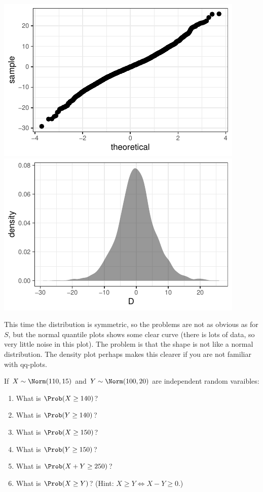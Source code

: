 \documentclass[twoside]{book}\usepackage[]{graphicx}\usepackage[]{xcolor}
\makeatletter
\def\maxwidth{ %
  \ifdim\Gin@nat@width>\linewidth
    \linewidth
  \else
    \Gin@nat@width
  \fi
}
\newenvironment{knitrout}{}{} %
\makeatother
\begin{document}
\begin{solution}
\begin{knitrout}
{\centering \includegraphics[width=\maxwidth]{figures/fig-unnamed-chunk-147-1} 
\includegraphics[width=\maxwidth]{figures/fig-unnamed-chunk-147-2} 

}



\end{knitrout}

This time the distribution is symmetric, so the problems are not as obvious as for $S$, but the 
normal quantile plots shows some clear curve (there is lots of data, so very little noise in
this plot).  The problem is that the shape is not like a normal distribution.  
The density plot perhaps makes this clearer if you are not familiar with qq-plots.
\end{solution}

\begin{problem}
	If $X \sim \Norm(110, 15)$ and $Y \sim \Norm(100, 20)$ are independent
	random varaibles:
	
	\begin{enumerate}
		\item
			What is $\Prob(X \ge 140)$?
		\item
			What is $\Prob(Y \ge 140)$?
		\item
			What is $\Prob(X \ge 150)$?
		\item
			What is $\Prob(Y \ge 150)$?
		\item
			What is $\Prob(X + Y \ge 250)$?
		\item
			What is $\Prob(X \ge Y)$? (Hint: $X \ge Y \Leftrightarrow X - Y \ge 0$.)
	\end{enumerate}
\end{problem}
\end{document}
